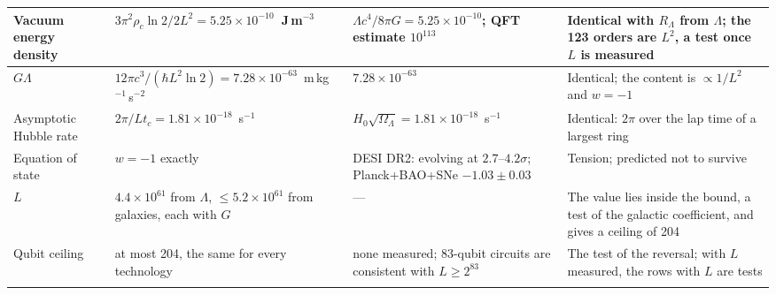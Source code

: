\documentclass[aps,prd,twocolumn,superscriptaddress,nofootinbib,showkeys]{revtex4-2}
\makeatletter
\newcommand{\tc}{t_c}
\newcommand{\RL}{R_\Lambda}
\def\section{\@startsection{section}{1}{\z@}{0.6cm \@plus1ex \@minus .2ex}{0.35cm}{\normalfont\small\bfseries}}
\makeatother
\begin{document}
\begin{ruledtabular}
\begin{tabular}{>{\raggedright\arraybackslash}p{2.3cm}>{\raggedright\arraybackslash}p{5.2cm}>{\raggedright\arraybackslash}p{4.3cm}>{\raggedright\arraybackslash}p{5.2cm}}
\hline
Vacuum energy density & $3\pi^2\rho_c\ln2/2L^2 = 5.25\times10^{-10}$~J\,m$^{-3}$ & $\Lambda c^4/8\pi G = 5.25\times10^{-10}$; QFT estimate $10^{113}$ & Identical with $\RL$ from $\Lambda$; the 123 orders are $L^2$, a test once $L$ is measured \\
\hline
$G\Lambda$ & $12\pi c^3/(\hbar L^2\ln2) = 7.28\times10^{-63}$~m\,kg$^{-1}$\,s$^{-2}$ & $7.28\times10^{-63}$ & Identical; the content is $\propto1/L^2$ and $w = -1$ \\
\hline
Asymptotic Hubble rate & $2\pi/L\tc = 1.81\times10^{-18}$~s$^{-1}$ & $H_0\sqrt{\Omega_\Lambda} = 1.81\times10^{-18}$~s$^{-1}$ & Identical: $2\pi$ over the lap time of a largest ring \\
\hline
Equation of state & $w = -1$ exactly & DESI DR2: evolving at $2.7$--$4.2\sigma$; Planck+BAO+SNe $-1.03\pm0.03$ & Tension; predicted not to survive \\
\hline
$L$ & $4.4\times10^{61}$ from $\Lambda$, $\le5.2\times10^{61}$ from galaxies, each with $G$ & --- & The value lies inside the bound, a test of the galactic coefficient, and gives a ceiling of 204 \\
\hline
Qubit ceiling & at most 204, the same for every technology & none measured; 83-qubit circuits are consistent with $L\ge2^{83}$ & The test of the reversal; with $L$ measured, the rows with $L$ are tests \\
\arrayrulecolor{black}
\end{tabular}
\end{ruledtabular}
\vspace{3pt}\par
\endgroup
\vspace{8pt}
\twocolumngrid

\section{Introduction}
\end{document}
